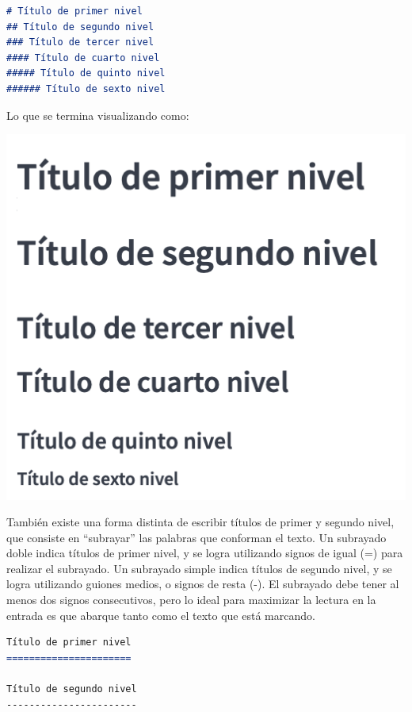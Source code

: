 \begin{lstlisting}[language=Markdown]
# Título de primer nivel
## Título de segundo nivel
### Título de tercer nivel
#### Título de cuarto nivel
##### Título de quinto nivel
###### Título de sexto nivel
\end{lstlisting}

Lo que se termina visualizando como:

\includegraphics[]{anexos/1_lenguajes_marcado/1_markdown/imagenes/md_titulos.png}

También existe una forma distinta de escribir títulos de primer y segundo
nivel, que consiste en ``subrayar'' las palabras que conforman el texto.
Un subrayado doble indica títulos de primer nivel, y se logra utilizando
signos de igual (=) para realizar el subrayado. Un subrayado simple indica
títulos de segundo nivel, y se logra utilizando guiones medios, o signos de
resta (-). El subrayado debe tener al menos dos signos consecutivos, pero
lo ideal para maximizar la lectura en la entrada es que abarque tanto como
el texto que está marcando.

\begin{lstlisting}[language=Markdown,otherkeywords={=,-},morekeywords={[2]{=,-}}]
Título de primer nivel
======================

Título de segundo nivel
-----------------------
\end{lstlisting}

